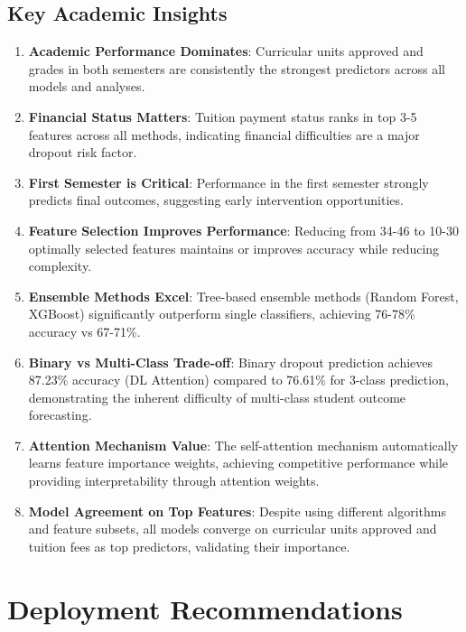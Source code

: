 \subsection{Key Academic Insights}

\begin{enumerate}
\item \textbf{Academic Performance Dominates}: Curricular units approved and grades in both semesters are consistently the strongest predictors across all models and analyses.

\item \textbf{Financial Status Matters}: Tuition payment status ranks in top 3-5 features across all methods, indicating financial difficulties are a major dropout risk factor.

\item \textbf{First Semester is Critical}: Performance in the first semester strongly predicts final outcomes, suggesting early intervention opportunities.

\item \textbf{Feature Selection Improves Performance}: Reducing from 34-46 to 10-30 optimally selected features maintains or improves accuracy while reducing complexity.

\item \textbf{Ensemble Methods Excel}: Tree-based ensemble methods (Random Forest, XGBoost) significantly outperform single classifiers, achieving 76-78\% accuracy vs 67-71\%.

\item \textbf{Binary vs Multi-Class Trade-off}: Binary dropout prediction achieves 87.23\% accuracy (DL Attention) compared to 76.61\% for 3-class prediction, demonstrating the inherent difficulty of multi-class student outcome forecasting.

\item \textbf{Attention Mechanism Value}: The self-attention mechanism automatically learns feature importance weights, achieving competitive performance while providing interpretability through attention weights.

\item \textbf{Model Agreement on Top Features}: Despite using different algorithms and feature subsets, all models converge on curricular units approved and tuition fees as top predictors, validating their importance.
\end{enumerate}

\section{Deployment Recommendations}

